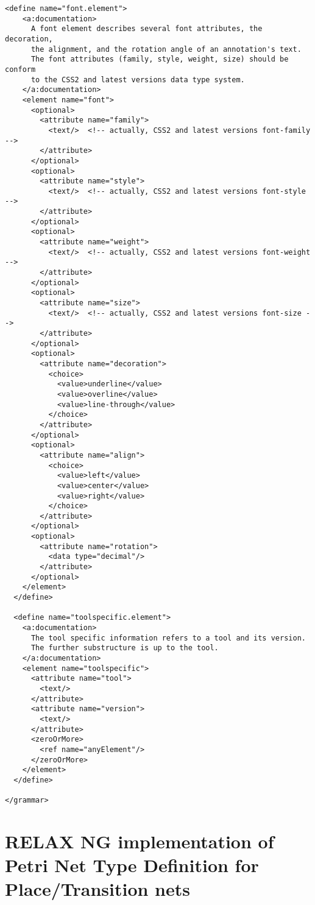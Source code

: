 \begin{lstlisting}[label=grammar_core,caption=RELAX NG implementation of PNML Core Model]
  <define name="font.element">
    <a:documentation>
      A font element describes several font attributes, the decoration, 
      the alignment, and the rotation angle of an annotation's text.
      The font attributes (family, style, weight, size) should be conform
      to the CSS2 and latest versions data type system.
    </a:documentation>
    <element name="font">
      <optional>
        <attribute name="family">
          <text/>  <!-- actually, CSS2 and latest versions font-family -->
        </attribute>
      </optional>
      <optional>
        <attribute name="style">
          <text/>  <!-- actually, CSS2 and latest versions font-style -->
        </attribute>
      </optional>
      <optional>
        <attribute name="weight">
          <text/>  <!-- actually, CSS2 and latest versions font-weight -->
        </attribute>
      </optional>
      <optional>
        <attribute name="size">
          <text/>  <!-- actually, CSS2 and latest versions font-size -->
        </attribute>
      </optional>
      <optional>
        <attribute name="decoration">
          <choice>
            <value>underline</value>
            <value>overline</value>
            <value>line-through</value>
          </choice>
        </attribute>
      </optional>
      <optional>
        <attribute name="align">
          <choice>
            <value>left</value>
            <value>center</value>
            <value>right</value>
          </choice>
        </attribute>
      </optional>
      <optional>
        <attribute name="rotation">
          <data type="decimal"/>
        </attribute>
      </optional>
    </element>
  </define>

  <define name="toolspecific.element">
    <a:documentation>
      The tool specific information refers to a tool and its version.
      The further substructure is up to the tool.
    </a:documentation>
    <element name="toolspecific">
      <attribute name="tool">
        <text/>
      </attribute>
      <attribute name="version">
        <text/>
      </attribute>
      <zeroOrMore>
        <ref name="anyElement"/>
      </zeroOrMore>
    </element>
  </define>
  
</grammar>
\end{lstlisting}







\newpage

\section{RELAX NG implementation of Petri Net Type Definition for Place/Transition nets}


